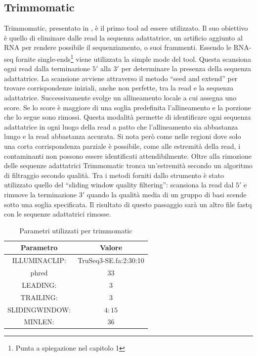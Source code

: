   	\subsection{Trimmomatic}
	Trimmomatic, presentato in \cite{trimmomatic}, \`e il primo tool ad essere utilizzato.
	Il suo obiettivo \`e quello di eliminare dalle read la sequenza adattatrice, un artificio aggiunto al RNA per rendere possibile il sequenziamento, o suoi frammenti.
	Essendo le RNA-seq fornite single-ends\footnote{Punta a spiegazione nel capitolo 1} viene utilizzata la simple mode del tool.
	Questa scansiona ogni read dalla terminazione $5'$ alla $3'$ per determinare la presenza della sequenza adattatrice.
        La scansione avviene attraverso il metodo ``seed and extend'' per trovare corrispondenze iniziali, anche non perfette, tra la read e la sequenza adattatrice.
	Successivamente svolge un allineamento locale a cui assegna uno score.
        Se lo score \`e maggiore di una soglia predefinita l'allineamento e la porzione che lo segue sono rimossi.
	Questa modalit\`a permette di identificare ogni sequenza adattatrice in ogni luogo della read a patto che l'allineamento sia abbastanza lungo e la read abbastanza accurata.
	Si nota per\`o come nelle regioni dove solo una corta corrispondenza parziale \`e possibile, come alle estremit\`a della read, i contaminanti non possono essere identificati attendibilmente.
	Oltre alla rimozione delle sequenze adattatrici Trimmomatic tronca un'estremit\`a secondo un algoritmo di filtraggio secondo qualit\`a.
	Tra i metodi forniti dallo strumento \`e stato utilizzato quello del ``sliding window quality filtering'':
	scansiona la read dal $5'$ e rimuove la terminazione $3'$ quando la qualit\`a media di un gruppo di basi scende sotto una soglia specificata.
	Il risultato di questo passaggio sar\`a un altro file fastq con le sequenze adattatrici rimosse.
        \begin{table}[H]
                \begin{tabular}{|c|c|}
                        \hline
                        Parametro & Valore\\
                        \hline
                        ILLUMINACLIP: & TruSeq3-SE.fa:2:30:10\\
                        \hline
                        phred & $33$\\
                        \hline
                        LEADING: & $3$\\
                        \hline
                        TRAILING: & $3$\\
                        \hline
                        SLIDINGWINDOW: & $4:15$\\
                        \hline
                        MINLEN: & $36$\\
                        \hline
                 \end{tabular}
                 \centering
                 \caption{Parametri utilizzati per trimmomatic}
        \end{table}

